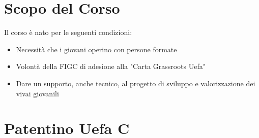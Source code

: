 \documentclass[../uefaC.tex]{subfiles}
\begin{document}
\onlyinsubfile{\maketitle}

\onlyinsubfile{\tableofcontents}


\section{Scopo del Corso}

Il corso è nato per le seguenti condizioni:

\begin{itemize}
    \item{Necessità che i giovani operino con persone formate}
    \item{Volontà della FIGC di adesione alla "Carta Grassroots Uefa"}
    \item{Dare un supporto, anche tecnico, al progetto di sviluppo e valorizzazione dei vivai giovanili}
\end{itemize}

\section{Patentino Uefa C}
\end{document}
